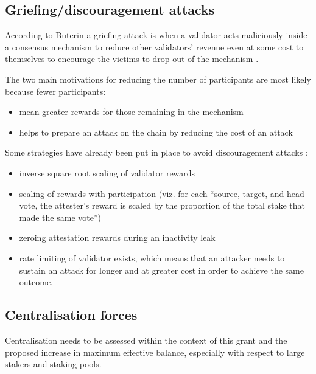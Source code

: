 \documentclass[UTF8]{article}
\begin{document}
\subsection{Griefing/discouragement attacks}
According to Buterin a griefing attack is when a validator acts maliciously inside a consensus mechanism to reduce other validators' revenue even at some cost to themselves to encourage the victims to drop out of the mechanism \cite{buterin2018c}.

The two main motivations for reducing the number of participants are most likely because fewer participants:
\begin{itemize}
\item mean greater rewards for those remaining in the mechanism
\item helps to prepare an attack on the chain by reducing the cost of an attack
\end{itemize}

Some strategies have already been put in place to avoid discouragement attacks \cite{Edgington2023}:
\begin{itemize}
\item inverse square root scaling of validator rewards
\item scaling of rewards with participation (viz. for each ``source, target, and head vote, the attester's reward is scaled by the proportion of the total stake that made the same vote'')
\item zeroing attestation rewards during an inactivity leak
\item rate limiting of validator exists, which means that an attacker needs to sustain an attack for longer and at greater cost in order to achieve the same outcome.
\end{itemize}

\subsection{Centralisation forces}
Centralisation needs to be assessed within the context of this grant and the proposed increase in maximum effective balance, especially with respect to large stakers and staking pools.


\end{document}
